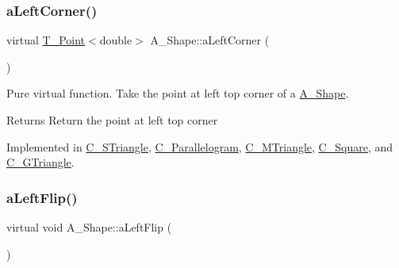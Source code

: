 \mbox{\label{classA__Shape_abe6781b13037bf7ecea8ff9456b31533}} 
\subsubsection{\texorpdfstring{a\+Left\+Corner()}{aLeftCorner()}}
{\footnotesize\ttfamily virtual \hyperlink{classT__Point}{T\+\_\+\+Point}$<$double$>$ A\+\_\+\+Shape\+::a\+Left\+Corner (\begin{DoxyParamCaption}{ }\end{DoxyParamCaption})\hspace{0.3cm}{\ttfamily [pure virtual]}}



Pure virtual function. Take the point at left top corner of a \hyperlink{classA__Shape}{A\+\_\+\+Shape}. 

\begin{DoxyReturn}{Returns}
Return the point at left top corner 
\end{DoxyReturn}


Implemented in \hyperlink{classC__STriangle_a8e580f80693ea6f66cca3782ced8e301}{C\+\_\+\+S\+Triangle}, \hyperlink{classC__Parallelogram_a260c557810c63dd97f2dd64bc15b9dc8}{C\+\_\+\+Parallelogram}, \hyperlink{classC__MTriangle_ad077fce026711bf0a25fc4c1cb83ecb9}{C\+\_\+\+M\+Triangle}, \hyperlink{classC__Square_a13e97bb379f1678636e3baf781c2a01b}{C\+\_\+\+Square}, and \hyperlink{classC__GTriangle_a57943afaad0f6b7c3c13aa35a233e93b}{C\+\_\+\+G\+Triangle}.

\mbox{\label{classA__Shape_abe947e7003cb63be2b4f6c439533427d}} 
\subsubsection{\texorpdfstring{a\+Left\+Flip()}{aLeftFlip()}}
{\footnotesize\ttfamily virtual void A\+\_\+\+Shape\+::a\+Left\+Flip (\begin{DoxyParamCaption}{ }\end{DoxyParamCaption})\hspace{0.3cm}{\ttfamily [pure virtual]}}



